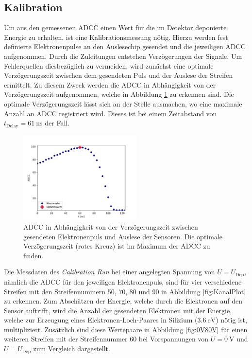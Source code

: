 \subsection{Kalibration}
\label{kap:Kalibration}
Um aus den gemessenen ADCC einen Wert für die im Detektor deponierte Energie zu erhalten, ist eine Kalibrationsmessung nötig. Hierzu werden fest definierte Elektronenpulse an den Auslesechip gesendet und die jeweiligen ADCC aufgenommen.
Durch die Zuleitungen entstehen Verzögerungen der Signale. Um Fehlerquellen diesbezüglich zu vermeiden, wird zunächst eine optimale Verzögerungszeit zwischen dem gesendeten Puls und der Auslese der Streifen ermittelt. Zu diesem Zweck werden die ADCC in Abhängigkeit von der Verzögerungszeit aufgenommen, welche in Abbildung \ref{fig:Delay} zu erkennen sind. Die optimale Verzögerungszeit lässt sich an der Stelle ausmachen, wo eine maximale Anzahl an ADCC registriert wird. Dieses ist bei einem Zeitabstand von $t_{\mathrm{Delay}}=\SI{61}{\nano\second}$ der Fall.
\begin{figure}
  \centering
  \includegraphics[width=0.55\textwidth]{plots/Delay.pdf}
  \caption{ADCC in Abhängigkeit von der Verzögerungszeit zwischen gesendeten Elektronenpuls und Auslese der Sensoren. Die optimale Verzögerungszeit (rotes Kreuz) ist im Maximum der ADCC zu finden.}
  \label{fig:Delay}
\end{figure}
\FloatBarrier
Die Messdaten des \textit{Calibration Run} bei einer angelegten Spannung von $U=U_\text{Dep}$, nämlich die ADCC für den jeweiligen Elektronenpuls, sind für vier verschiedene Streifen mit den Streifennummern 50, 70, 80 und 90 in Abbildung \ref{fig:KanalPlot} zu erkennen. Zum Abschätzen der Energie, welche durch die Elektronen auf den Sensor auftrifft, wird die Anzahl der gesendeten Elektronen mit der Energie, welche zur Erzeugung eines Elektronen-Loch-Paares in Silizium ($\SI{3.6}{\electronvolt}$) nötig ist, multipliziert. Zusätzlich sind diese Wertepaare in Abbildung \ref{fig:0V80V} für einen weiteren Streifen mit der Streifennummer 60 bei Vorspannungen von $U=\SI{0}{\volt}$ und $U=U_{\mathrm{Dep}}$ zum Vergleich dargestellt.
